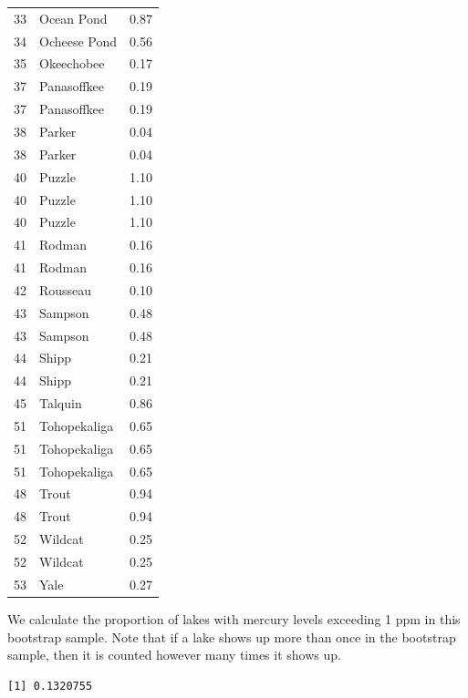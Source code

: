 \documentclass[
  letterpaper,
  DIV=11,
  numbers=noendperiod]{scrreprt}
\newenvironment{Shaded}{\begin{snugshade}}{\end{snugshade}}
\newcommand{\DecValTok}[1]{\textcolor[rgb]{0.68,0.00,0.00}{#1}}
\newcommand{\FunctionTok}[1]{\textcolor[rgb]{0.28,0.35,0.67}{#1}}
\newcommand{\NormalTok}[1]{\textcolor[rgb]{0.00,0.23,0.31}{#1}}
\newcommand{\SpecialCharTok}[1]{\textcolor[rgb]{0.37,0.37,0.37}{#1}}
\begin{document}
\begin{longtable}[]{@{}rlr@{}}
33 & Ocean Pond & 0.87 \\
34 & Ocheese Pond & 0.56 \\
35 & Okeechobee & 0.17 \\
37 & Panasoffkee & 0.19 \\
37 & Panasoffkee & 0.19 \\
38 & Parker & 0.04 \\
38 & Parker & 0.04 \\
40 & Puzzle & 1.10 \\
40 & Puzzle & 1.10 \\
40 & Puzzle & 1.10 \\
41 & Rodman & 0.16 \\
41 & Rodman & 0.16 \\
42 & Rousseau & 0.10 \\
43 & Sampson & 0.48 \\
43 & Sampson & 0.48 \\
44 & Shipp & 0.21 \\
44 & Shipp & 0.21 \\
45 & Talquin & 0.86 \\
51 & Tohopekaliga & 0.65 \\
51 & Tohopekaliga & 0.65 \\
51 & Tohopekaliga & 0.65 \\
48 & Trout & 0.94 \\
48 & Trout & 0.94 \\
52 & Wildcat & 0.25 \\
52 & Wildcat & 0.25 \\
53 & Yale & 0.27 \\
\end{longtable}

We calculate the proportion of lakes with mercury levels exceeding 1 ppm
in this bootstrap sample. Note that if a lake shows up more than once in
the bootstrap sample, then it is counted however many times it shows up.

\begin{Shaded}
\end{Shaded}

\begin{verbatim}
[1] 0.1320755
\end{verbatim}
\end{document}
